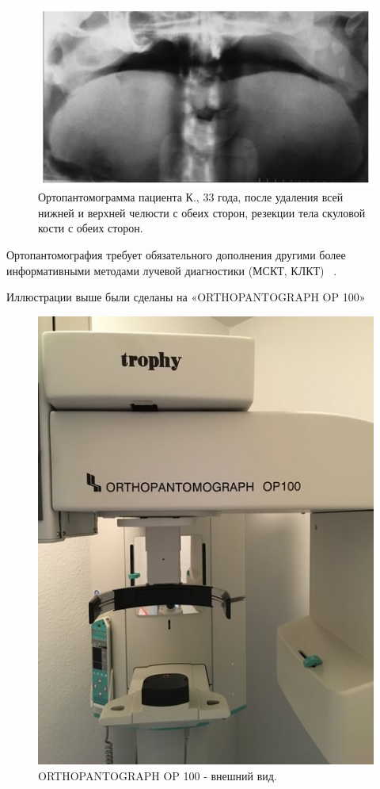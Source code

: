 \documentclass[11pt]{article}
\begin{document}
	\begin{figure}[H]
	\centering
	\includegraphics[width=\textwidth]{optg_10}
	\caption{Ортопантомограмма пациента  К., 33 года, после удаления всей нижней и верхней челюсти с обеих сторон, резекции тела скуловой кости с обеих сторон.
	 }
	\label{fig:optg_10}
\end{figure}
	
	Ортопантомография требует обязательного дополнения другими более информативными методами лучевой диагностики (МСКТ, КЛКТ) ~\cite{80-157-1-SM}. 
		
	Иллюстрации выше были сделаны на «ORTHOPANTOGRAPH OP 100»
	
	\begin{figure}[H]
		\centering
		\includegraphics[width=\textwidth]{optg_9}
		\caption{ORTHOPANTOGRAPH OP 100 - внешний вид. }
		\label{fig:optg_9}
	\end{figure}
\end{document}
